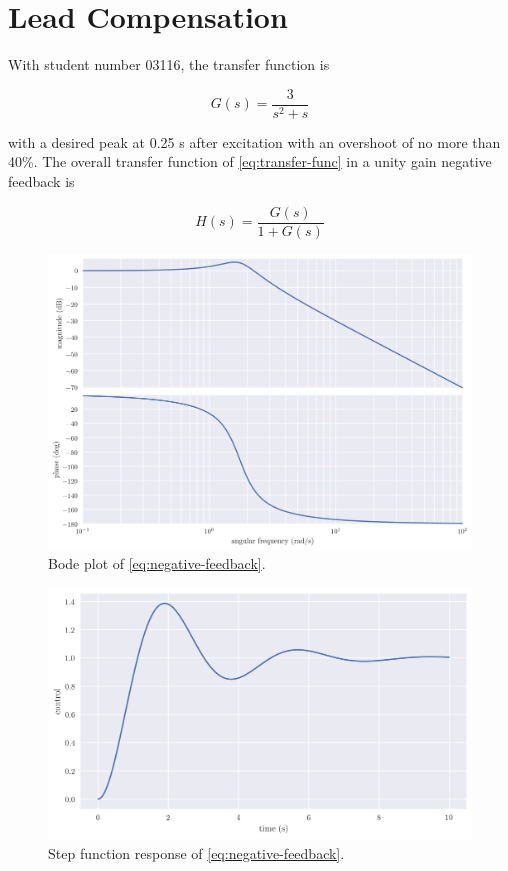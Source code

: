 \documentclass[12pt,a4paper]{article}
\begin{document}
\setcounter{page}{1}

\section*{Lead Compensation}
\bigskip

With student number 03116, the transfer function is

\begin{equation}
	G(s) = \frac{3}{s^2 + s} \label{eq:transfer-func}
\end{equation}

\noindent
with a desired peak at 0.25 s after excitation with an overshoot of no more than 40\%. The overall transfer function of \eqref{eq:transfer-func} in a unity gain negative feedback is

\begin{equation}
	H(s) = \frac{G(s)}{1 + G(s)} \label{eq:negative-feedback}
\end{equation}

\begin{figure}[h!]
	\centering
	\includegraphics[width=0.7\linewidth]{sys_bode.png}
	\caption{Bode plot of \eqref{eq:negative-feedback}.}
	\label{fig:bode}
\end{figure}

\begin{figure}[h!]
	\centering
	\includegraphics[width=0.7\linewidth]{sys-response.png}
	\caption{Step function response of \eqref{eq:negative-feedback}.}
	\label{fig:sys-response}
\end{figure}
\end{document}

